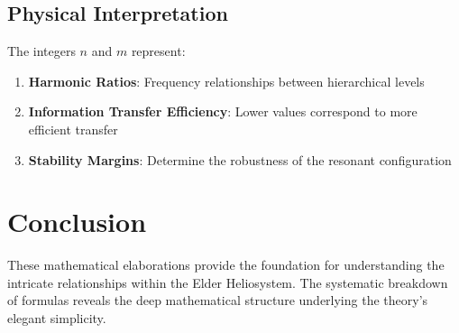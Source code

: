 \subsection{Physical Interpretation}

The integers $n$ and $m$ represent:
\begin{enumerate}
    \item \textbf{Harmonic Ratios}: Frequency relationships between hierarchical levels
    \item \textbf{Information Transfer Efficiency}: Lower values correspond to more efficient transfer
    \item \textbf{Stability Margins}: Determine the robustness of the resonant configuration
\end{enumerate}

\section{Conclusion}

These mathematical elaborations provide the foundation for understanding the intricate relationships within the Elder Heliosystem. The systematic breakdown of formulas reveals the deep mathematical structure underlying the theory's elegant simplicity.